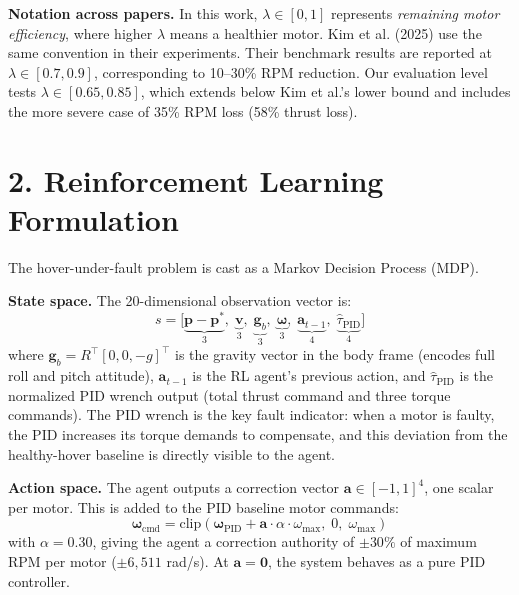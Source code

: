 \documentclass[12pt,letterpaper]{article}
\begin{document}
\textbf{Notation across papers.} In this work, $\lambda \in [0, 1]$ represents \textit{remaining motor efficiency}, where higher $\lambda$ means a healthier motor. Kim et al. (2025) use the same convention in their experiments. Their benchmark results are reported at $\lambda \in [0.7, 0.9]$, corresponding to 10--30\% RPM reduction. Our evaluation level tests $\lambda \in [0.65, 0.85]$, which extends below Kim et al.'s lower bound and includes the more severe case of 35\% RPM loss (58\% thrust loss).

\section*{2. Reinforcement Learning Formulation}

The hover-under-fault problem is cast as a Markov Decision Process (MDP).

\textbf{State space.} The 20-dimensional observation vector is:
\begin{equation}
    s = \Big[\underbrace{\mathbf{p} - \mathbf{p}^*}_{3},\;
              \underbrace{\mathbf{v}}_{3},\;
              \underbrace{\mathbf{g}_b}_{3},\;
              \underbrace{\boldsymbol{\omega}}_{3},\;
              \underbrace{\mathbf{a}_{t-1}}_{4},\;
              \underbrace{\hat{\tau}_{\text{PID}}}_{4}
    \Big]
\end{equation}
where $\mathbf{g}_b = R^\top [0,0,-g]^\top$ is the gravity vector in the body frame (encodes full roll and pitch attitude), $\mathbf{a}_{t-1}$ is the RL agent's previous action, and $\hat{\tau}_{\text{PID}}$ is the normalized PID wrench output (total thrust command and three torque commands). The PID wrench is the key fault indicator: when a motor is faulty, the PID increases its torque demands to compensate, and this deviation from the healthy-hover baseline is directly visible to the agent.

\textbf{Action space.} The agent outputs a correction vector $\mathbf{a} \in [-1, 1]^4$, one scalar per motor. This is added to the PID baseline motor commands:
\begin{equation}
    \boldsymbol{\omega}_{\text{cmd}} = \text{clip}\!\left(\boldsymbol{\omega}_{\text{PID}} + \mathbf{a} \cdot \alpha \cdot \omega_{\max},\; 0,\; \omega_{\max}\right)
\end{equation}
with $\alpha = 0.30$, giving the agent a correction authority of $\pm 30\%$ of maximum RPM per motor ($\pm 6{,}511$ rad/s). At $\mathbf{a} = \mathbf{0}$, the system behaves as a pure PID controller.
\end{document}
